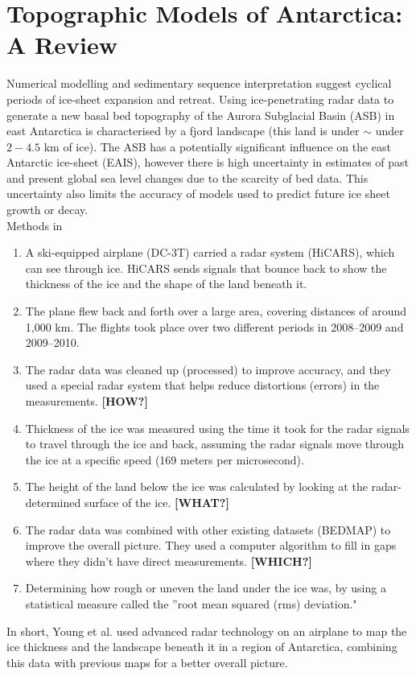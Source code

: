 \section*{Topographic Models of Antarctica: A Review}\label{review}
Numerical modelling and sedimentary sequence interpretation suggest cyclical periods of ice-sheet expansion and retreat\cite{Young_2011}. Using ice-penetrating radar data to generate a new basal bed topography of the Aurora Subglacial Basin (ASB) in east Antarctica is characterised by a fjord landscape (this land is under $\sim$ under $2-4.5$ km of ice). The ASB has a potentially significant influence on the east Antarctic ice-sheet (EAIS), however there is high uncertainty in estimates of past and present global sea level changes due to the scarcity of bed data\cite{Young_2011}. This uncertainty also limits the accuracy of models used to predict future ice sheet growth or decay.\\
{\large Methods in\cite{Young_2011}}
\begin{enumerate}
    \item A ski-equipped airplane (DC-3T) carried a radar system (HiCARS), which can see through ice. HiCARS sends signals that bounce back to show the thickness of the ice and the shape of the land beneath it.
    \item The plane flew back and forth over a large area, covering distances of around 1,000 km. The flights took place over two different periods in 2008–2009 and 2009–2010.
    \item The radar data was cleaned up (processed) to improve accuracy, and they used a special radar system that helps reduce distortions (errors) in the measurements. \textbf{[HOW?]}
    \item Thickness of the ice was measured using the time it took for the radar signals to travel through the ice and back, assuming the radar signals move through the ice at a specific speed (169 meters per microsecond).
    \item The height of the land below the ice was calculated by looking at the radar-determined surface of the ice. \textbf{[WHAT?]}
    \item The radar data was combined with other existing datasets (BEDMAP) to improve the overall picture. They used a computer algorithm to fill in gaps where they didn’t have direct measurements. \textbf{[WHICH?]}
    \item Determining how rough or uneven the land under the ice was, by using a statistical measure called the ''root mean squared (rms) deviation."
\end{enumerate}
In short, Young et al. used advanced radar technology on an airplane to map the ice thickness and the landscape beneath it in a region of Antarctica, combining this data with previous maps for a better overall picture.
